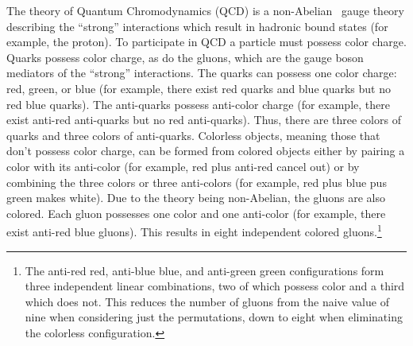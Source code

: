
The theory of Quantum Chromodynamics (QCD) is a non-Abelian
\suthree~gauge theory describing the ``strong'' interactions
which result in hadronic bound states (for example, the proton). 
To participate in QCD a particle must possess color charge. 
Quarks possess color charge, as do the gluons, which are the gauge boson
mediators of the ``strong'' interactions. The quarks can possess one color charge:
red, green, or blue
(for example, there exist red quarks and blue quarks but no red blue quarks).
The anti-quarks possess anti-color charge (for example, there exist
anti-red anti-quarks but no red anti-quarks). Thus, there are three colors
of quarks and three colors of anti-quarks.  
Colorless objects, meaning those that don't possess color charge, 
can be formed from colored objects either by pairing
a color with its anti-color (for example, red plus anti-red cancel out) or by 
combining the three colors or three anti-colors  (for example,
red plus blue pus green makes white).
Due to the theory being non-Abelian, the gluons are also colored.
Each gluon possesses one
color and one anti-color (for example, there exist anti-red blue gluons).
This results in eight independent 
colored gluons.\footnote{The anti-red red, anti-blue
blue, and anti-green green configurations 
form three independent linear combinations, two of which possess 
color and a third
which does not. This reduces the number of gluons from the naive
value of nine when considering just the permutations, down to eight
when eliminating the colorless configuration.}


